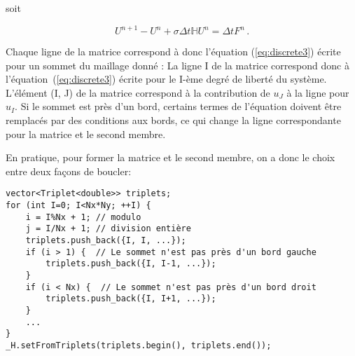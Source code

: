 \documentclass[11pt]{article}
\begin{document}

soit

\begin{equation}
U^{n+1} - U^{n} + \sigma\Delta t \mathbb{H} U^{n} = \Delta t F^{n} \,.
\end{equation}

Chaque ligne de la matrice correspond à donc l'équation (\ref{eq:discrete3}) écrite pour un sommet du maillage donné : La ligne I de la matrice correspond donc à l'équation~(\ref{eq:discrete3}) écrite pour le I-ème degré de liberté du système. L'élément (I, J) de la matrice correspond à la contribution de $u_J$ à la ligne pour $u_I$. Si le sommet est près d'un bord, certains termes de l'équation doivent être remplacés par des conditions aux bords, ce qui change la ligne correspondante pour la matrice et le second membre.


\bigskip


En pratique, pour former la matrice et le second membre, on a donc le choix entre deux façons de boucler:

\begin{Verbatim}
vector<Triplet<double>> triplets;
for (int I=0; I<Nx*Ny; ++I) {
    i = I%Nx + 1; // modulo
    j = I/Nx + 1; // division entière
    triplets.push_back({I, I, ...});
    if (i > 1) {  // Le sommet n'est pas près d'un bord gauche
        triplets.push_back({I, I-1, ...});
    }
    if (i < Nx) {  // Le sommet n'est pas près d'un bord droit
        triplets.push_back({I, I+1, ...});
    } 
    ...
}
_H.setFromTriplets(triplets.begin(), triplets.end());
\end{Verbatim}
\end{document}
